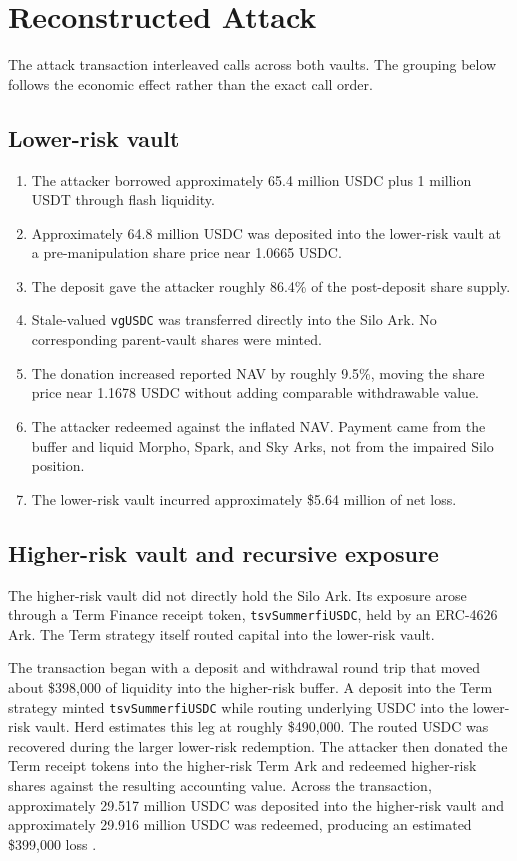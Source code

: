 \documentclass[11pt]{article}
\begin{document}
\section{Reconstructed Attack}

The attack transaction interleaved calls across both vaults.  The grouping below follows the economic effect rather than the exact call order.

\subsection{Lower-risk vault}

\begin{enumerate}[nosep]
    \item The attacker borrowed approximately 65.4 million USDC plus 1 million USDT through flash liquidity.
    \item Approximately 64.8 million USDC was deposited into the lower-risk vault at a pre-manipulation share price near 1.0665 USDC.
    \item The deposit gave the attacker roughly 86.4\% of the post-deposit share supply.
    \item Stale-valued \texttt{vgUSDC} was transferred directly into the Silo Ark.  No corresponding parent-vault shares were minted.
    \item The donation increased reported NAV by roughly 9.5\%, moving the share price near 1.1678 USDC without adding comparable withdrawable value.
    \item The attacker redeemed against the inflated NAV.  Payment came from the buffer and liquid Morpho, Spark, and Sky Arks, not from the impaired Silo position.
    \item The lower-risk vault incurred approximately \$5.64 million of net loss.
\end{enumerate}

\subsection{Higher-risk vault and recursive exposure}

The higher-risk vault did not directly hold the Silo Ark.  Its exposure arose through a Term Finance receipt token, \texttt{tsvSummerfiUSDC}, held by an ERC-4626 Ark.  The Term strategy itself routed capital into the lower-risk vault.

The transaction began with a deposit and withdrawal round trip that moved about \$398,000 of liquidity into the higher-risk buffer.  A deposit into the Term strategy minted \texttt{tsvSummerfiUSDC} while routing underlying USDC into the lower-risk vault.  Herd estimates this leg at roughly \$490,000.  The routed USDC was recovered during the larger lower-risk redemption.  The attacker then donated the Term receipt tokens into the higher-risk Term Ark and redeemed higher-risk shares against the resulting accounting value.  Across the transaction, approximately 29.517 million USDC was deposited into the higher-risk vault and approximately 29.916 million USDC was redeemed, producing an estimated \$399,000 loss \cite{ba-retrospective,herd-analysis}.
\end{document}
